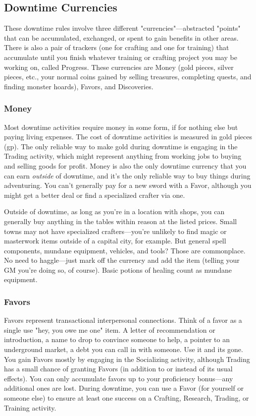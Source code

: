 \subsection{Downtime Currencies}
These downtime rules involve three different "currencies"---abstracted "points" that can be accumulated, exchanged, or spent to gain benefits in other areas. There is also a pair of trackers (one for crafting and one for training) that accumulate until you finish whatever training or crafting project you may be working on, called Progress. These currencies are Money (gold pieces, silver pieces, etc., your normal coins gained by selling treasures, completing quests, and finding monster hoards), Favors, and Discoveries.

\subsubsection{Money}
Most downtime activities require money in some form, if for nothing else but paying living expenses. The cost of downtime activities is measured in gold pieces (gp). The only reliable way to make gold during downtime is engaging in the Trading activity, which might represent anything from working jobs to buying and selling goods for profit. Money is also the only downtime currency that you can earn \textit{outside} of downtime, and it's the only reliable way to buy things during adventuring. You can't generally pay for a new sword with a Favor, although you might get a better deal or find a specialized crafter via one.

Outside of downtime, as long as you're in a location with shops, you can generally buy anything in the  tables within reason at the listed prices. Small towns may not have specialized crafters---you're unlikely to find magic or masterwork items outside of a capital city, for example. But general spell components, mundane equipment, vehicles, and tools? Those are commonplace. No need to haggle---just mark off the currency and add the item (telling your GM you're doing so, of course). Basic potions of healing count as mundane equipment.

\subsubsection{Favors}
Favors represent transactional interpersonal connections. Think of a favor as a single use "hey, you owe me one" item. A letter of recommendation or introduction, a name to drop to convince someone to help, a pointer to an underground market, a debt you can call in with someone. Use it and its gone. You gain Favors mostly by engaging in the Socializing activity, although Trading has a small chance of granting Favors (in addition to or instead of its usual effects). You can only accumulate favors up to your proficiency bonus---any additional ones are lost. During downtime, you can use a Favor (for yourself or someone else) to ensure at least one success on a Crafting, Research, Trading, or Training activity. 

